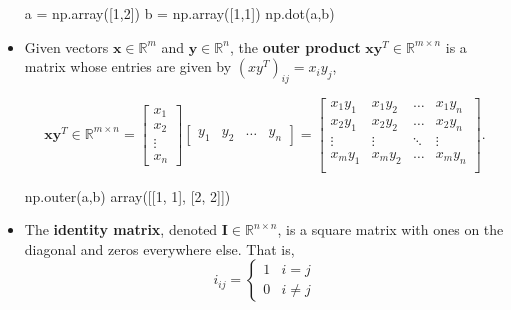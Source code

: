 \begin{itemize}
\begin{python}
a = np.array([1,2])
b = np.array([1,1])
np.dot(a,b)
\end{python}

\item Given vectors $\textbf{x} \in \mathbb{R}^{m}$ and $\textbf{y} \in \mathbb{R}^{n}$, the {\bf outer product} $\textbf{xy}^{T} \in \mathbb{R}^{m\times n}$
is a matrix whose entries are given by $({xy}^{T})_{ij}=x_{i}y_{j}$,


\begin{equation*}
\textbf{xy}^{T} \in \mathbb{R}^{m\times n} = \left[\begin{array}{c}
x_{1} \\ x_{2} \\ \vdots \\ x_{n}\end{array}\right] \left[\begin{array}{cccc}
y_{1} &
y_{2} &
\ldots &
y_{n}
\end{array}\right] =   \left[\begin{array}{cccc}
x_{1}y_{1} & x_{1}y_{2} & \ldots & x_{1}y_{n} \\
x_{2}y_{1} & x_{2}y_{2} & \ldots & x_{2}y_{n} \\
\vdots & \vdots & \ddots & \vdots \\
x_{m}y_{1} & x_{m}y_{2} & \ldots & x_{m}y_{n} \\
\end{array}\right].
\end{equation*}

\begin{python}
np.outer(a,b)
array([[1, 1],
       [2, 2]])
\end{python}


\item The {\bf identity matrix}, denoted $\textbf{I}\in \mathbb{R}^{n\times n}$, is a square matrix with ones on the diagonal and zeros 
everywhere else. That is,
%
\begin{equation*}
i_{ij}=\left\{\begin{array}{cc}
1 & i=j \\
0 & i\neq j
\end{array}\right.
\end{equation*}


\end{itemize}
